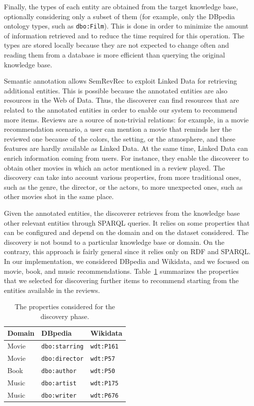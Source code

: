 Finally, the types of each entity are obtained from the target knowledge base, optionally considering only a subset of them (for example, only the DBpedia ontology types, such as \texttt{dbo:Film}). This is done in order to minimize the amount of information retrieved and to reduce the time required for this operation. The types are stored locally because they are not expected to change often and reading them from a database is more efficient than querying the original knowledge base.

Semantic annotation allows SemRevRec to exploit Linked Data for retrieving additional entities. This is possible because the annotated entities are also resources in the Web of Data. Thus, the discoverer can find resources that are related to the annotated entities in order to enable our system to recommend more items. Reviews are a source of non-trivial relations: for example, in a movie recommendation scenario, a user can mention a movie that reminds her the reviewed one because of the colors, the setting, or the atmosphere, and these features are hardly available as Linked Data. At the same time, Linked Data can enrich information coming from users. For instance, they enable the discoverer to obtain other movies in which an actor mentioned in a review played. The discovery can take into account various properties, from more traditional ones, such as the genre, the director, or the actors, to more unexpected ones, such as other movies shot in the same place.

Given the annotated entities, the discoverer retrieves from the knowledge base other relevant entities through SPARQL queries. It relies on some properties that can be configured and depend on the domain and on the dataset considered. The discovery is not bound to a particular knowledge base or domain. On the contrary, this approach is fairly general since it relies only on RDF and SPARQL. In our implementation, we considered DBpedia and Wikidata, and we focused on movie, book, and music recommendations. Table~\ref{srr:tab:disc} summarizes the properties that we selected for discovering further items to recommend starting from the entities available in the reviews.

\begin{table}
\centering
\begin{tabular}{@{}lll@{}}
\toprule
Domain & DBpedia               & Wikidata          \\ \midrule
Movie  & \texttt{dbo:starring} & \texttt{wdt:P161} \\
Movie  & \texttt{dbo:director} & \texttt{wdt:P57}  \\
Book   & \texttt{dbo:author}   & \texttt{wdt:P50}  \\
Music  & \texttt{dbo:artist}   & \texttt{wdt:P175} \\
Music  & \texttt{dbo:writer}   & \texttt{wdt:P676} \\ \bottomrule
\end{tabular}
\caption[Properties for discovery phase]{The properties considered for the discovery phase.}
\label{srr:tab:disc}
\end{table}

